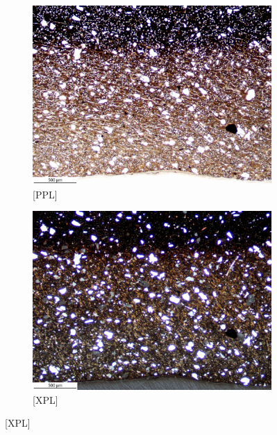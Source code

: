 \documentclass[a4paper]{article}
\begin{document}
\begin{figure}[H]
	\centering
	\begin{subfigure}[t]{.49\textwidth}
		\includegraphics[width=\textwidth]{ThinSections/110-1_4x_PPL.jpg}
		\caption{[PPL]}
	\end{subfigure}\hspace{.5em}\hfill
	\begin{subfigure}[t]{.49\textwidth}
		\includegraphics[width=\textwidth]{ThinSections/110-1_4x_XPL.jpg}
		\caption{[XPL]}
	\end{subfigure}

\end{figure}
\end{document}
